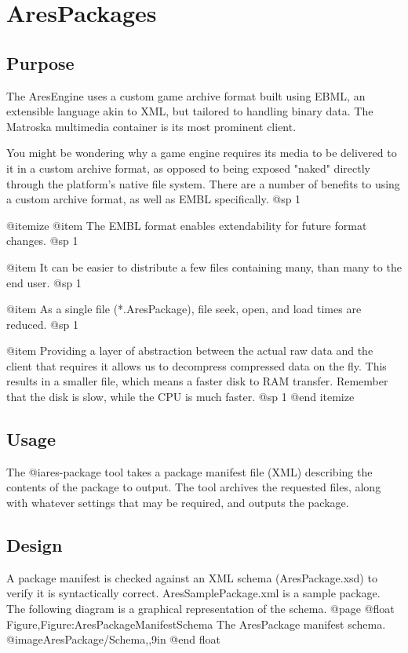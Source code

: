 \section{AresPackages}

\subsection{Purpose}

The AresEngine uses a custom game archive format built using EBML, an extensible language akin to XML, but tailored to handling binary data. The Matroska multimedia container is its most prominent client.

You might be wondering why a game engine requires its media to be delivered to it in a custom archive format, as opposed to being exposed "naked" directly through the platform's native file system. There are a number of benefits to using a custom archive format, as well as EMBL specifically.
@sp 1

@itemize
@item
The EMBL format enables extendability for future format changes.
@sp 1

@item
It can be easier to distribute a few files containing many, than many to the end user.
@sp 1

@item
As a single file (*.AresPackage), file seek, open, and load times are reduced.
@sp 1

@item
Providing a layer of abstraction between the actual raw data and the client that requires it allows us to decompress compressed data on the fly. This results in a smaller file, which means a faster disk to RAM transfer. Remember that the disk is slow, while the CPU is much faster.
@sp 1
@end itemize

\subsection{Usage}
The @i{ares-package} tool takes a package manifest file (XML) describing the contents of the package to output. The tool archives the requested files, along with whatever settings that may be required, and outputs the package.

\subsection{Design}
A package manifest is checked against an XML schema (AresPackage.xsd) to verify it is syntactically correct. AresSamplePackage.xml is a sample package. The following diagram is a graphical representation of the schema.
@page
@float Figure,Figure:AresPackageManifestSchema
The AresPackage manifest schema.
@image{AresPackage/Schema,,9in}
@end float

